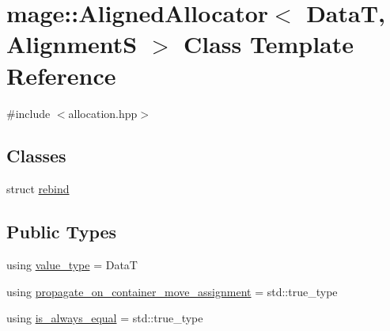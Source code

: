 \hypertarget{classmage_1_1_aligned_allocator}{}\section{mage\+:\+:Aligned\+Allocator$<$ DataT, AlignmentS $>$ Class Template Reference}
\label{classmage_1_1_aligned_allocator}


{\ttfamily \#include $<$allocation.\+hpp$>$}

\subsection*{Classes}
\begin{DoxyCompactItemize}
\item 
struct \hyperlink{structmage_1_1_aligned_allocator_1_1rebind}{rebind}
\end{DoxyCompactItemize}
\subsection*{Public Types}
\begin{DoxyCompactItemize}
\item 
using \hyperlink{classmage_1_1_aligned_allocator_a04614928948b5589c241726e3441e058}{value\+\_\+type} = DataT
\item 
using \hyperlink{classmage_1_1_aligned_allocator_ab0fce958c6e7a2a51861d9179067aa33}{propagate\+\_\+on\+\_\+container\+\_\+move\+\_\+assignment} = std\+::true\+\_\+type
\item 
using \hyperlink{classmage_1_1_aligned_allocator_a7733565bae4efdc332035461bc307df8}{is\+\_\+always\+\_\+equal} = std\+::true\+\_\+type
\end{DoxyCompactItemize}
